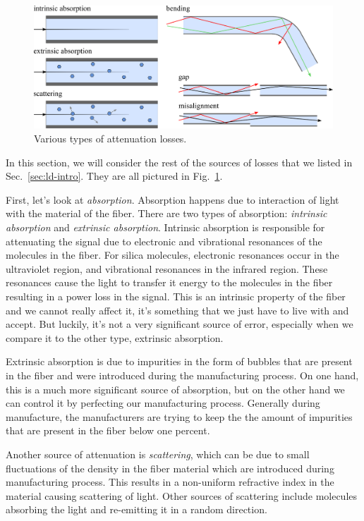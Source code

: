 \begin{figure}[t]
    \centering
    \includegraphics[width=\textwidth]{lesson11/11-3_attenuation.pdf}
    \caption[Attenuation losses]{Various types of attenuation losses.}
    \label{fig:11-3_attenuation}
\end{figure}
In this section, we will consider the rest of the sources of losses that we listed in Sec.~\ref{sec:ld-intro}.
They are all pictured in Fig.~\ref{fig:11-3_attenuation}.

First, let's look at \emph{absorption}.
Absorption happens due to interaction of light with the material of the fiber. There are two types of absorption: \emph{intrinsic absorption} and \emph{extrinsic absorption}. Intrinsic absorption is responsible for attenuating the signal due to electronic and vibrational resonances of the molecules in the fiber. For silica molecules, electronic resonances occur in the ultraviolet region, and vibrational resonances in the infrared region. These resonances cause the light to transfer it energy to the molecules in the fiber resulting in a power loss in the signal. This is an intrinsic property of the fiber and we cannot really affect it, it's something that we just have to live with and accept. But luckily, it's not a very significant source of error, especially when we compare it to the other type, extrinsic absorption.

Extrinsic absorption is due to impurities in the form of bubbles that are present in the fiber and were introduced during the manufacturing process. On one hand, this is a much more significant source of absorption, but on the other hand we can control it by perfecting our manufacturing process. Generally during manufacture, the manufacturers are trying to keep the the amount of impurities that are present in the fiber below one percent.

Another source of attenuation is \emph{scattering}, which can be due to small fluctuations of the density in the fiber material which are introduced during manufacturing process.
This results in a non-uniform refractive index in the material causing scattering of light.
Other sources of scattering include molecules absorbing the light and re-emitting it in a random direction.

